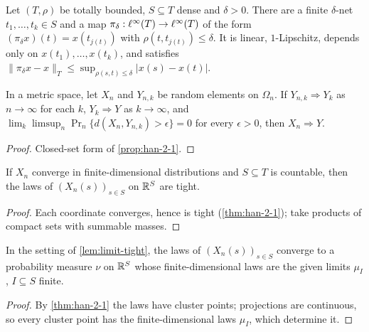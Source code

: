 \begin{lemma}
  \label{lem:net-projection}
  Let $(T,\rho)$ be totally bounded, $S\subseteq T$ dense and $\delta>0$. There are a finite $\delta$-net $t_1,\dots,t_k\in S$ and a map $\pi_\delta:\ell^\infty(T)\to\ell^\infty(T)$ of the form $(\pi_\delta x)(t)=x(t_{j(t)})$ with $\rho(t,t_{j(t)})\le\delta$. It is linear, $1$-Lipschitz, depends only on $x(t_1),\dots,x(t_k)$, and satisfies $\|\pi_\delta x-x\|_T\le\sup_{\rho(s,t)\le\delta}|x(s)-x(t)|$.
\end{lemma}

\begin{lemma}
  \label{lem:approx}
  In a metric space, let $X_n$ and $Y_{n,k}$ be random elements on $\Omega_n$. If $Y_{n,k}\Rightarrow Y_k$ as $n\to\infty$ for each $k$, $Y_k\Rightarrow Y$ as $k\to\infty$, and $\lim_k\limsup_n\Pr_n\{d(X_n,Y_{n,k})>\epsilon\}=0$ for every $\epsilon>0$, then $X_n\Rightarrow Y$.
\end{lemma}
\begin{proof}
  Closed-set form of \cref{prop:han-2-1}.
\end{proof}

\begin{lemma}
  \label{lem:limit-tight}
  If $X_n$ converge in finite-dimensional distributions and $S\subseteq T$ is countable, then the laws of $(X_n(s))_{s\in S}$ on $\mathbb{R}^S$ are tight.
\end{lemma}
\begin{proof}
  Each coordinate converges, hence is tight (\cref{thm:han-2-1}); take products of compact sets with summable masses.
\end{proof}

\begin{lemma}
  \label{lem:limit-fidi}
  In the setting of \cref{lem:limit-tight}, the laws of $(X_n(s))_{s\in S}$ converge to a probability measure $\nu$ on $\mathbb{R}^S$ whose finite-dimensional laws are the given limits $\mu_I$, $I\subseteq S$ finite.
\end{lemma}
\begin{proof}
  By \cref{thm:han-2-1} the laws have cluster points; projections are continuous, so every cluster point has the finite-dimensional laws $\mu_I$, which determine it.
\end{proof}

